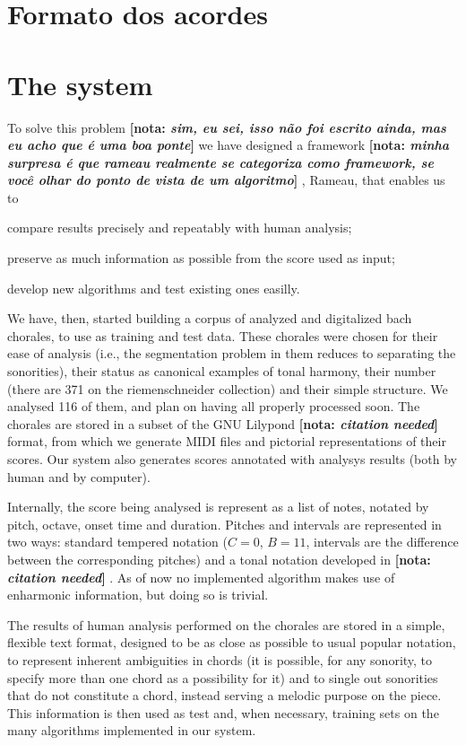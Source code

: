\documentclass{article}
\newcommand{\nota}[1]{
  \textbf{[nota: \textit{#1}]}
}
\begin{document}
\section{Formato dos acordes}
\label{sec:formato-dos-acordes}


\section{The system}
\label{sec:system}

To solve this problem \nota{sim, eu sei, isso não foi escrito ainda,
  mas eu acho que é uma boa ponte} we have designed a framework \nota{
  minha surpresa é que rameau realmente se categoriza como framework,
  se você olhar do ponto de vista de um algoritmo}, Rameau, that
enables us to
\begin{list}{\textbf{.}}{}
\item compare results precisely and repeatably with human analysis;
\item preserve as much information as possible from the score used as
  input;
\item develop new algorithms and test existing ones easilly.
\end{list}

We have, then, started building a corpus of analyzed and digitalized
bach chorales, to use as training and test data. These chorales were
chosen for their ease of analysis (i.e., the segmentation problem in
them reduces to separating the sonorities), their status as canonical
examples of tonal harmony, their number (there are 371 on the
riemenschneider collection) and their simple structure. We analysed
116 of them, and plan on having all properly processed soon. The
chorales are stored in a subset of the GNU Lilypond \nota{citation
  needed} format, from which we generate MIDI files and pictorial
representations of their scores. Our system also generates scores
annotated with analysys results (both by human and by computer).

Internally, the score being analysed is represent as a list of notes,
notated by pitch, octave, onset time and duration. Pitches and
intervals are represented in two ways: standard tempered notation ($C
= 0$, $B = 11$, intervals are the difference between the corresponding
pitches) and a tonal notation developed in \nota{citation needed}. As
of now no implemented algorithm makes use of enharmonic information,
but doing so is trivial.

The results of human analysis performed on the chorales are stored in
a simple, flexible text format, designed to be as close as possible to
usual popular notation, to represent inherent ambiguities in chords
(it is possible, for any sonority, to specify more than one chord as a
possibility for it) and to single out sonorities that do not
constitute a chord, instead serving a melodic purpose on the
piece. This information is then used as test and, when necessary,
training sets on the many algorithms implemented in our system.
\end{document}
